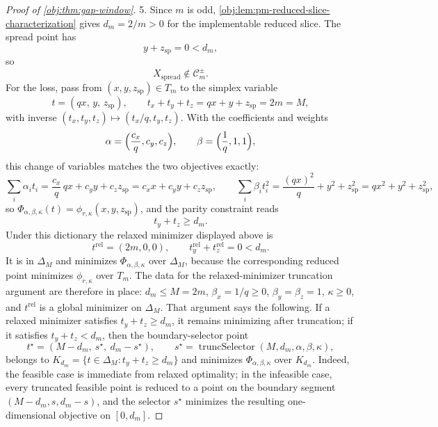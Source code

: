 \begin{proof}[Proof of \cref{obj:thm:gap-window}]
5.  Since \(m\) is odd, \cref{obj:lem:pm-reduced-slice-characterization} gives \(d_m=2/m>0\) for the implementable reduced slice. The spread point has
\[
y+z_{\mathrm{sp}}=0<d_m,
\]
so
\[
X_{\mathrm{spread}}\notin\mathcal C_m^{\pm}.
\]
For the loss, pass from \((x,y,z_{\mathrm{sp}})\in T_m\) to the simplex variable
\[
t=(qx,\,y,\,z_{\mathrm{sp}}),
\qquad
t_x+t_y+t_z=qx+y+z_{\mathrm{sp}}=2m=M,
\]
with inverse \((t_x,t_y,t_z)\mapsto(t_x/q,t_y,t_z)\).  With the coefficients and weights
\[
\alpha=\Bigl(\frac{c_x}{q},c_y,c_z\Bigr),
\qquad
\beta=\Bigl(\frac1q,1,1\Bigr),
\]
this change of variables matches the two objectives exactly:
\[
\sum_i\alpha_it_i=\frac{c_x}{q}\,qx+c_yy+c_zz_{\mathrm{sp}}
=c_xx+c_yy+c_zz_{\mathrm{sp}},
\qquad
\sum_i\beta_it_i^2=\frac{(qx)^2}{q}+y^2+z_{\mathrm{sp}}^2=qx^2+y^2+z_{\mathrm{sp}}^2,
\]
so \(\Phi_{\alpha,\beta,\kappa}(t)=\phi_{r,\kappa}(x,y,z_{\mathrm{sp}})\), and the parity constraint reads
\[
t_y+t_z\ge d_m.
\]
Under this dictionary the relaxed minimizer displayed above is
\[
t^{\mathrm{rel}}=(2m,0,0),
\qquad
t^{\mathrm{rel}}_y+t^{\mathrm{rel}}_z=0<d_m .
\]
It is in \(\Delta_M\) and minimizes \(\Phi_{\alpha,\beta,\kappa}\) over \(\Delta_M\), because the corresponding reduced point minimizes \(\phi_{r,\kappa}\) over \(T_m\). The data for the relaxed-minimizer truncation argument are therefore in place: \(d_m\le M=2m\), \(\beta_x=1/q\ge0\), \(\beta_y=\beta_z=1\), \(\kappa\ge0\), and \(t^{\mathrm{rel}}\) is a global minimizer on \(\Delta_M\). That argument says the following. If a relaxed minimizer satisfies \(t_y+t_z\ge d_m\), it remains minimizing after truncation; if it satisfies \(t_y+t_z<d_m\), then the boundary-selector point
\[
t^\star
=
\left(M-d_m,\ s^\star,\ d_m-s^\star\right),
\qquad
s^\star=
\operatorname{truncSelector}(M,d_m,\alpha,\beta,\kappa),
\]
belongs to \(K_{d_m}=\{t\in\Delta_M:t_y+t_z\ge d_m\}\) and minimizes \(\Phi_{\alpha,\beta,\kappa}\) over \(K_{d_m}\). Indeed, the feasible case is immediate from relaxed optimality; in the infeasible case, every truncated feasible point is reduced to a point on the boundary segment \((M-d_m,s,d_m-s)\), and the selector \(s^\star\) minimizes the resulting one-dimensional objective on \([0,d_m]\).


\end{proof}
